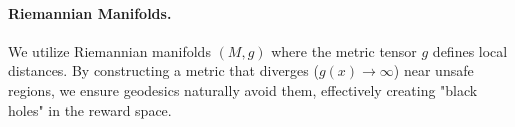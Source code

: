 \paragraph{Riemannian Manifolds.} We utilize Riemannian manifolds $(M, g)$ where the metric tensor $g$ defines local distances. By constructing a metric that diverges ($g(x) \to \infty$) near unsafe regions, we ensure geodesics naturally avoid them, effectively creating "black holes" in the reward space.
